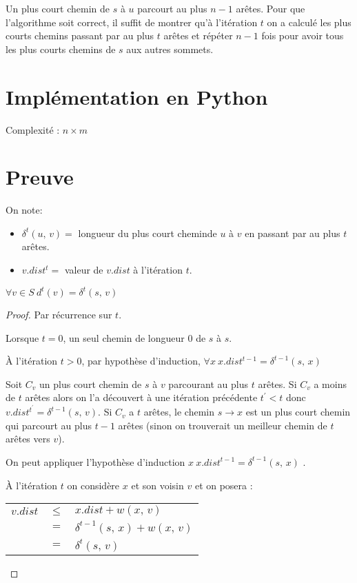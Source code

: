 Un plus court chemin de $s$ à $u$ parcourt au plus $n - 1$ arêtes. Pour que l'algorithme soit correct, il suffit de montrer qu'à l'itération $t$ on a calculé les plus courts chemins passant par au plus $t$ arêtes et répéter $n - 1$ fois pour avoir tous les plus courts chemins de $s$ aux autres sommets.

\section{Implémentation en Python}



Complexité : $n \times m$


\vspace*{0.2cm}
\section{Preuve}

\begin{definition} On note:

\begin{itemize}
\item $\delta^{t}(u,\, v) = $ longueur du plus court cheminde $u$ à $v$ en passant par au plus $t$ arêtes.
\item $v.dist^{t} = $ valeur de $v.dist$ à l'itération $t$.
\end{itemize}
\end{definition}

\begin{proposition}
$\forall v \in S \ d^{t}(v) = \delta^{t}(s,\, v)$
\end{proposition}

\begin{proof}
Par récurrence sur $t$.

Lorsque $t = 0$, un seul chemin de longueur $0$ de $s$ à $s$.

À l'itération $t > 0$, par hypothèse d'induction, $\forall x \ x.dist^{t-1} = \delta^{t-1}(s,\, x)$

Soit $C_{v}$ un plus court chemin de $s$ à $v$ parcourant au plus $t$ arêtes. Si $C_{v}$ a moins de $t$ arêtes alors on l'a découvert à une itération précédente $t^{\prime} < t$ donc $v.dist^{t^{\prime}} = \delta^{t-1}(s,\, v)$. Si $C_{v}$ a $t$ arêtes, le chemin $s \longrightarrow x$ est un plus court chemin qui parcourt au plus $t - 1$ arêtes (sinon on trouverait un meilleur chemin de $t$ arêtes vers $v$).

On peut appliquer l'hypothèse d'induction $x \ x.dist^{t-1} = \delta^{t-1}(s,\, x)$ .

À l'itération $t$ on considère $x$ et son voisin $v$ et on posera :

\begin{tabular}{l l l}
$v.dist$ & $\leq$ & $x.dist + w(x,\, v)$ \\
	& $=$ & $\delta^{t-1}(s,\, x) + w(x,\, v)$ \\
	& $=$ & $\delta^{t}(s,\, v)$ \\
\end{tabular}
\end{proof}